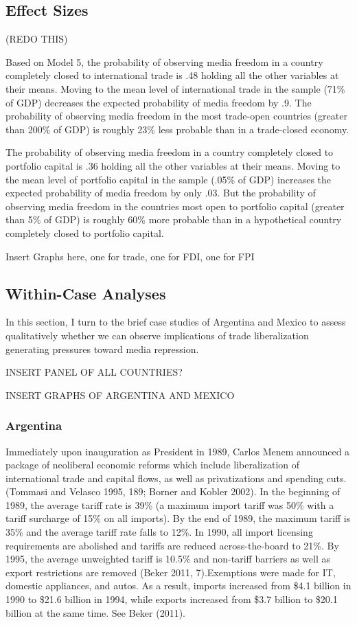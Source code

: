 \documentclass[12pt,a4paper]{article}\usepackage[]{graphicx}\usepackage[]{color}
\begin{document}
\subsection{Effect Sizes}

(REDO THIS)

Based on Model 5, the probability of observing media freedom in a country completely closed to international trade is .48 holding all the other variables at their means. Moving to the mean level of international trade in the sample (71\% of GDP) decreases the expected probability of media freedom by .9. The probability of observing media freedom in the most trade-open countries (greater than 200\% of GDP) is roughly 23\% less probable than in a trade-closed economy.

The probability of observing media freedom in a country completely closed to portfolio capital is .36 holding all the other variables at their means. Moving to the mean level of portfolio capital in the sample (.05\% of GDP) increases the expected probability of media freedom by only .03. But the probability of observing media freedom in the countries most open to portfolio capital (greater than 5\% of GDP) is roughly 60\% more probable than in a hypothetical country completely closed to portfolio capital.

Insert Graphs here, one for trade, one for FDI, one for FPI

\subsection{Within-Case Analyses}

In this section, I turn to the brief case studies of Argentina and Mexico to assess qualitatively whether we can observe implications of trade liberalization generating pressures toward media repression.

INSERT PANEL OF ALL COUNTRIES?

INSERT GRAPHS OF ARGENTINA AND MEXICO

\subsubsection{Argentina}

Immediately upon inauguration as President in 1989, Carlos Menem announced a package of neoliberal economic reforms which include liberalization of international trade and capital flows, as well as privatizations and spending cuts. (Tommasi and Velasco 1995, 189; Borner and Kobler 2002). In the beginning of 1989, the average tariff rate is 39\% (a maximum import tariff was 50\% with a tariff surcharge of 15\% on all imports). By the end of 1989, the maximum tariff is 35\% and the average tariff rate falls to 12\%. In 1990, all import licensing requirements are abolished and tariffs are reduced across-the-board to 21\%. By 1995, the average unweighted tariff is 10.5\% and non-tariff barriers as well as export restrictions are removed (Beker 2011, 7).Exemptions were made for IT, domestic appliances, and autos. As a result, imports increased from \$4.1 billion in 1990 to \$21.6 billion in 1994, while exports increased from \$3.7 billion to \$20.1 billion at the same time. See Beker (2011).
\end{document}
